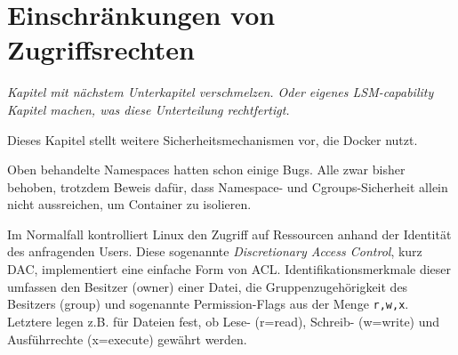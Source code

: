 \documentclass[../main.tex]{subfiles}
\begin{document}







  \section{Einschränkungen von Zugriffsrechten}
		\emph{Kapitel mit nächstem Unterkapitel verschmelzen. Oder eigenes LSM-capability Kapitel machen, was diese Unterteilung rechtfertigt.}

		Dieses Kapitel stellt weitere Sicherheitsmechanismen vor, die Docker nutzt.

		Oben behandelte Namespaces hatten schon einige Bugs. Alle zwar bisher behoben, trotzdem Beweis dafür, dass Namespace- und Cgroups-Sicherheit allein nicht aussreichen, um Container zu isolieren.

		Im Normalfall kontrolliert Linux den Zugriff auf Ressourcen anhand der Identität des anfragenden Users. Diese sogenannte \emph{Discretionary Access Control}, kurz \acrshort{DAC}, implementiert eine einfache Form von \acrshort{ACL}. Identifikationsmerkmale dieser umfassen den Besitzer (owner) einer Datei, die Gruppenzugehörigkeit des Besitzers (group) und sogenannte Permission-Flags aus der Menge \texttt{r,w,x}. Letztere legen z.B. für Dateien fest, ob Lese- (r=read), Schreib- (w=write) und Ausführrechte (x=execute) gewährt werden.
\end{document}
